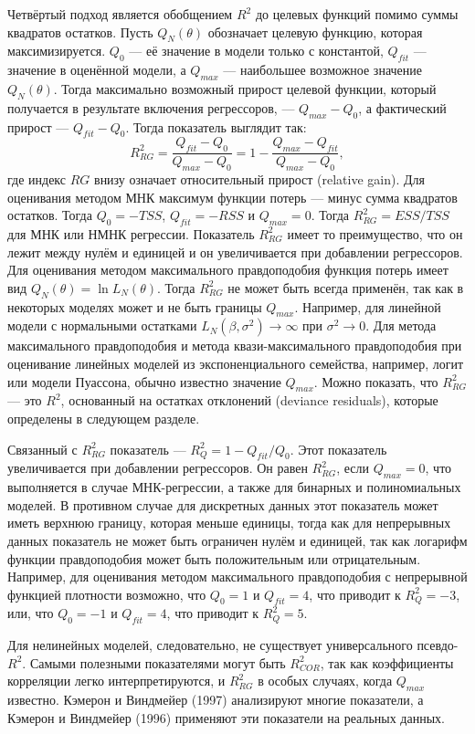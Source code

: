 Четвёртый подход является обобщением $R^2$ до целевых функций помимо суммы квадратов остатков. Пусть $Q_N(\theta)$ обозначает целевую функцию, которая максимизируется. $Q_0$ --- её значение в модели только с константой, $Q_{fit}$ --- значение в оценённой модели, а $Q_{max}$ --- наибольшее возможное значение $Q_N(\theta)$. Тогда максимально возможный прирост целевой функции, который получается в результате включения регрессоров, --- $Q_{max} - Q_0$, а фактический прирост --- $Q_{fit} - Q_0$. Тогда показатель выглядит так:
\[
R_{RG}^2 = \frac{Q_{fit} - Q_0}{Q_{max} - Q_0} = 1 - \frac{Q_{max} - Q_{fit}}{Q_{max} - Q_0},
\]
где индекс $RG$ внизу означает относительный прирост (relative gain). Для оценивания методом МНК максимум функции потерь ---  минус сумма квадратов остатков. Тогда $Q_0 = - TSS$, $Q_{fit} = - RSS$ и $Q_{max} = 0$. Тогда $R_{RG}^2 = ESS/TSS$ для МНК или НМНК регрессии. Показатель $R_{RG}^2$ имеет то преимущество, что он лежит между нулём и единицей и он увеличивается при добавлении регрессоров. Для оценивания методом максимального правдоподобия функция потерь имеет вид $Q_N(\theta) = \ln L_N(\theta)$. Тогда $R_{RG}^2$ не может быть всегда применён, так как в некоторых моделях может и не быть границы $Q_{max}$. Например, для линейной модели с нормальными остатками $L_N(\beta, \sigma^2) \rightarrow \infty$ при $\sigma^ 2 \rightarrow 0$. Для метода максимального правдоподобия и метода квази-максимального правдоподобия при оценивание линейных моделей из экспоненциального семейства, например, логит или модели Пуассона, обычно известно значение $Q_{max}$. Можно показать, что $R_{RG}^2$ --- это $R^2$, основанный на остатках отклонений (deviance residuals), которые определены в следующем разделе.

Связанный с $R_{RG}^2$ показатель --- $R_{Q}^2 = 1 - Q_{fit}/Q_0$. Этот показатель увеличивается при добавлении регрессоров. Он равен $R_{RG}^2$, если $Q_{max} = 0$, что выполняется в случае МНК-регрессии, а также для бинарных и полиномиальных моделей. В противном случае для дискретных данных этот показатель может иметь верхнюю границу, которая меньше единицы, тогда как для непрерывных данных показатель не может быть ограничен нулём и единицей, так как логарифм функции правдоподобия может быть положительным или отрицательным. Например, для оценивания методом максимального правдоподобия с непрерывной функцией плотности возможно, что $Q_0 = 1$ и $Q_{fit} = 4$, что приводит к $R_Q^2 = -3$, или, что $Q_0 = - 1$ и $Q_{fit} = 4$, что приводит к $R_Q^2 = 5$.

Для нелинейных моделей, следовательно, не существует универсального псевдо-$R^2$. Самыми полезными показателями могут быть $R_{COR}^2$, так как коэффициенты корреляции легко интерпретируются, и $R_{RG}^2$ в особых случаях, когда $Q_{max}$ известно. Кэмерон и Виндмейер (1997) анализируют многие показатели, а Кэмерон и Виндмейер (1996) применяют эти показатели на реальных данных.

